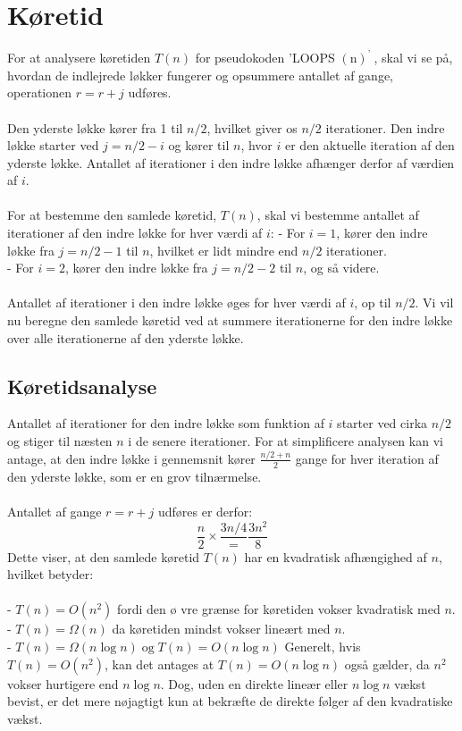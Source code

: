 \documentclass{article}
\begin{document}
\section{Køretid}
For at analysere køretiden $T(n)$ for pseudokoden 'LOOPS $(\mathrm{n})^{\text {' }}$, skal vi se på, hvordan de indlejrede løkker fungerer og opsummere antallet af gange, operationen $r=r+j$ udføres.
\\
\\
Den yderste løkke kører fra 1 til $n / 2$, hvilket giver os $n / 2$ iterationer. Den indre løkke starter ved $j=n / 2-i$ og kører til $n$, hvor $i$ er den aktuelle iteration af den yderste løkke. Antallet af iterationer i den indre løkke afhænger derfor af værdien af $i$.
\\
\\
For at bestemme den samlede køretid, $T(n)$, skal vi bestemme antallet af iterationer af den indre løkke for hver værdi af $i$:
- For $i=1$, kører den indre løkke fra $j=n / 2-1$ til $n$, hvilket er lidt mindre end $n / 2$ iterationer.
\\
- For $i=2$, kører den indre løkke fra $j=n / 2-2$ til $n$, og så videre.
\\
\\
Antallet af iterationer i den indre løkke øges for hver værdi af $i$, op til $n / 2$. Vi vil nu beregne den samlede køretid ved at summere iterationerne for den indre løkke over alle iterationerne af den yderste løkke.

\subsection{Køretidsanalyse}
Antallet af iterationer for den indre løkke som funktion af $i$ starter ved cirka $n / 2$ og stiger til næsten $n$ i de senere iterationer. For at simplificere analysen kan vi antage, at den indre løkke i gennemsnit kører $\frac{n / 2+n}{2}$ gange for hver iteration af den yderste løkke, som er en grov tilnærmelse.
\\
\\
Antallet af gange $r=r+j$ udføres er derfor:
$$
\frac{n}{2} \times \frac{3 n / 4}{=} \frac{3 n^2}{8}
$$
Dette viser, at den samlede køretid $T(n)$ har en kvadratisk afhængighed af $n$, hvilket betyder:
\\
\\
- $T(n)=O\left(n^2\right)$ fordi den $ø$ vre grænse for køretiden vokser kvadratisk med $n$.
\\
- $T(n)=\Omega(n)$ da køretiden mindst vokser lineært med $n$.
\\
- $T(n)=\Omega(n \log n) \operatorname{og} T(n)=O(n \log n)$ Generelt, hvis $T(n)=O\left(n^2\right)$, kan det antages at $T(n)=O(n \log n)$ også gælder, da $n^2$ vokser hurtigere end $n \log n$. Dog, uden en direkte lineær eller $n \log n$ vækst bevist, er det mere nøjagtigt kun at bekræfte de direkte følger af den kvadratiske vækst.
\end{document}
